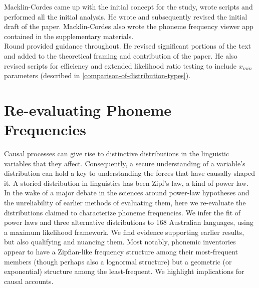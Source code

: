 \noindent
Macklin-Cordes came up with the initial concept for the study, wrote scripts and performed all the initial analysis. He wrote and subsequently revised the initial draft of the paper. Macklin-Cordes also wrote the phoneme frequency viewer app contained in the supplementary materials.\\

\noindent
Round provided guidance throughout. He revised significant portions of the text and added to the theoretical framing and contribution of the paper. He also revised scripts for efficiency and extended likelihood ratio testing to include $x_{min}$ parameters (described in \ref{comparison-of-distribution-types}).


\chapter[Re-evaluating phoneme frequencies]{Re-evaluating Phoneme Frequencies}
\label{Chap:phon-freqs}	%
\pagestyle{headings}

Causal processes can give rise to distinctive distributions in the linguistic variables that they affect. Consequently, a secure understanding of a variable's distribution can hold a key to understanding the forces that have causally shaped it. A storied distribution in linguistics has been Zipf's law, a kind of power law. In the wake of a major debate in the sciences around power-law hypotheses and the unreliability of earlier methods of evaluating them, here we re-evaluate the distributions claimed to characterize phoneme frequencies. We infer the fit of power laws and three alternative distributions to 168 Australian languages, using a maximum likelihood framework. We find evidence supporting earlier results, but also qualifying and nuancing them. Most notably, phonemic inventories appear to have a Zipfian-like frequency structure among their most-frequent members (though perhaps also a lognormal structure) but a geometric (or exponential) structure among the least-frequent. We highlight implications for causal accounts.

